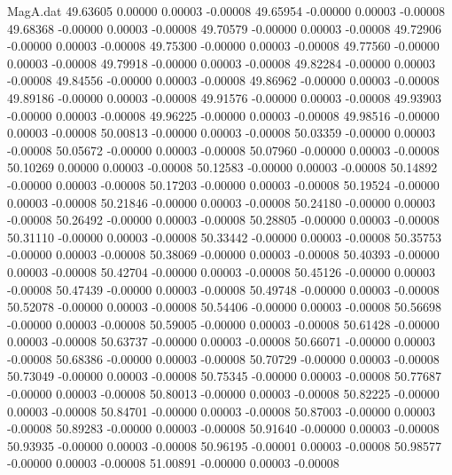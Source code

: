 \begin{filecontents}{MagA.dat}
  49.63605    0.00000    0.00003   -0.00008
  49.65954   -0.00000    0.00003   -0.00008
  49.68368   -0.00000    0.00003   -0.00008
  49.70579   -0.00000    0.00003   -0.00008
  49.72906   -0.00000    0.00003   -0.00008
  49.75300   -0.00000    0.00003   -0.00008
  49.77560   -0.00000    0.00003   -0.00008
  49.79918   -0.00000    0.00003   -0.00008
  49.82284   -0.00000    0.00003   -0.00008
  49.84556   -0.00000    0.00003   -0.00008
  49.86962   -0.00000    0.00003   -0.00008
  49.89186   -0.00000    0.00003   -0.00008
  49.91576   -0.00000    0.00003   -0.00008
  49.93903   -0.00000    0.00003   -0.00008
  49.96225   -0.00000    0.00003   -0.00008
  49.98516   -0.00000    0.00003   -0.00008
  50.00813   -0.00000    0.00003   -0.00008
  50.03359   -0.00000    0.00003   -0.00008
  50.05672   -0.00000    0.00003   -0.00008
  50.07960   -0.00000    0.00003   -0.00008
  50.10269    0.00000    0.00003   -0.00008
  50.12583   -0.00000    0.00003   -0.00008
  50.14892   -0.00000    0.00003   -0.00008
  50.17203   -0.00000    0.00003   -0.00008
  50.19524   -0.00000    0.00003   -0.00008
  50.21846   -0.00000    0.00003   -0.00008
  50.24180   -0.00000    0.00003   -0.00008
  50.26492   -0.00000    0.00003   -0.00008
  50.28805   -0.00000    0.00003   -0.00008
  50.31110   -0.00000    0.00003   -0.00008
  50.33442   -0.00000    0.00003   -0.00008
  50.35753   -0.00000    0.00003   -0.00008
  50.38069   -0.00000    0.00003   -0.00008
  50.40393   -0.00000    0.00003   -0.00008
  50.42704   -0.00000    0.00003   -0.00008
  50.45126   -0.00000    0.00003   -0.00008
  50.47439   -0.00000    0.00003   -0.00008
  50.49748   -0.00000    0.00003   -0.00008
  50.52078   -0.00000    0.00003   -0.00008
  50.54406   -0.00000    0.00003   -0.00008
  50.56698   -0.00000    0.00003   -0.00008
  50.59005   -0.00000    0.00003   -0.00008
  50.61428   -0.00000    0.00003   -0.00008
  50.63737   -0.00000    0.00003   -0.00008
  50.66071   -0.00000    0.00003   -0.00008
  50.68386   -0.00000    0.00003   -0.00008
  50.70729   -0.00000    0.00003   -0.00008
  50.73049   -0.00000    0.00003   -0.00008
  50.75345   -0.00000    0.00003   -0.00008
  50.77687   -0.00000    0.00003   -0.00008
  50.80013   -0.00000    0.00003   -0.00008
  50.82225   -0.00000    0.00003   -0.00008
  50.84701   -0.00000    0.00003   -0.00008
  50.87003   -0.00000    0.00003   -0.00008
  50.89283   -0.00000    0.00003   -0.00008
  50.91640   -0.00000    0.00003   -0.00008
  50.93935   -0.00000    0.00003   -0.00008
  50.96195   -0.00001    0.00003   -0.00008
  50.98577   -0.00000    0.00003   -0.00008
  51.00891   -0.00000    0.00003   -0.00008

\end{filecontents}
